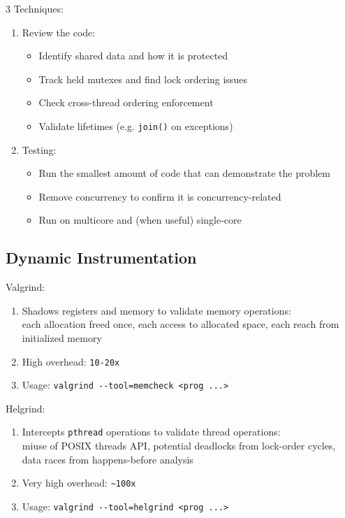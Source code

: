 \documentclass[12pt, a4paper]{article}
\begin{document}
\begin{multicols*}{3}
Techniques:
\begin{enumerate}[\roman*.]
\item Review the code:
\begin{itemize}[leftmargin=*]\vspace{3pt}
\item Identify shared data and how it is protected
\item Track held mutexes and find lock ordering issues
\item Check cross-thread ordering enforcement
\item Validate lifetimes (e.g. \lstinline|join()| on exceptions)
\end{itemize}
\item Testing:
\begin{itemize}[leftmargin=*]\vspace{3pt}
\item Run the smallest amount of code that can demonstrate the problem
\item Remove concurrency to confirm it is concurrency-related
\item Run on multicore and (when useful) single-core
\end{itemize}
\end{enumerate}
\colbreak
\subsection{Dynamic Instrumentation}

Valgrind:
\begin{enumerate}[\roman*.]
  \item Shadows registers and memory to validate memory operations:\\each allocation freed once, each access to allocated space, each reach from initialized memory
  \item High overhead: \lstinline|10-20x|
  \item Usage: \lstinline|valgrind --tool=memcheck <prog ...>|
\end{enumerate}

Helgrind:
\begin{enumerate}[\roman*.]
  \item Intercepts \lstinline|pthread| operations to validate thread operations:\\miuse of POSIX threads API, potential deadlocks from lock-order cycles, data races from happens-before analysis
  \item Very high overhead: \lstinline|~100x|
  \item Usage: \lstinline|valgrind --tool=helgrind <prog ...>|
\end{enumerate}


\end{multicols*}
\end{document}
